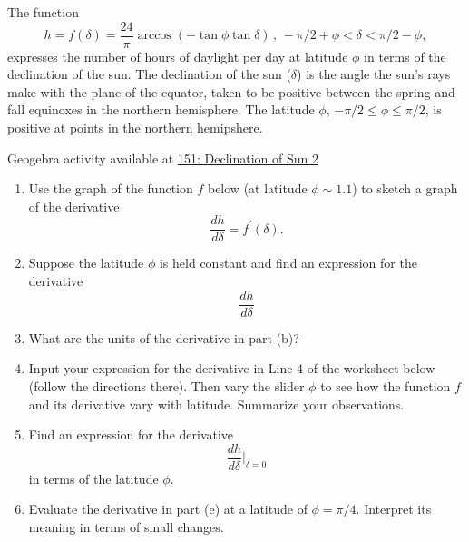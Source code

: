 \documentclass{ximera}
\begin{document}
\begin{question}  \label{Q:er43455}
The function
\[
    h = f(\delta) = \frac{24}{\pi} \arccos(-\tan\phi \tan\delta) \, , \, -\pi/2+\phi < \delta < \pi/2-\phi ,
\]
expresses the number of hours of daylight per day at latitude $\phi$ in terms of the declination of the sun. The declination of the sun ($\delta$) is the angle the sun's rays make with the plane of the equator, taken to be positive between the spring and fall equinoxes in the northern hemisphere. The latitude $\phi$, $-\pi/2 \leq \phi \leq \pi/2$, is positive at points in the northern hemipshere.

\begin{onlineOnly}
    \begin{center}
\end{center}
\end{onlineOnly}

Geogebra activity available at \href{https://www.geogebra.org/classic/vnhrutwu}{151: Declination of Sun 2}

\begin{enumerate}
\item Use the graph of the function $f$ below (at latitude $\phi \sim 1.1$) to sketch a graph of the derivative
\[
   \frac{dh}{d\delta} = f^\prime(\delta) .
\]

\item Suppose the latitude $\phi$ is held constant and find an expression for the derivative 
\[
   \frac{dh}{d\delta} %
\]

\item What are the units of the derivative in part (b)?

\item Input your expression for the derivative in Line 4 of the worksheet below (follow the directions there). Then vary the slider $\phi$ to see how the function $f$ and its derivative vary with latitude. Summarize your observations.

\item Find an expression for the derivative 
\[
   \frac{dh}{d\delta}\Big|_{\delta = 0} %
\]
in terms of the latitude $\phi$. 

\item Evaluate the derivative in part (e) at a latitude of $\phi =\pi/4$. Interpret its meaning in terms of small changes.


\end{enumerate}
\end{question}
\end{document}
